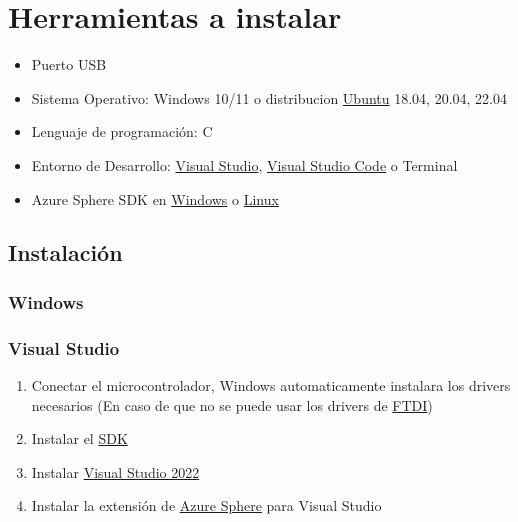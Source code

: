 \section{Herramientas a instalar}

\begin{itemize}
	\item 
	Puerto USB
	\item
	Sistema Operativo: Windows 10/11 o 
	distribucion \href{https://ubuntu.com/}{Ubuntu} 18.04, 20.04, 22.04
	\item 
	Lenguaje de programación: C
	\item 
	Entorno de Desarrollo: \href{https://visualstudio.microsoft.com/es/}{Visual Studio}, 
	\href{https://code.visualstudio.com/}{Visual Studio Code} o Terminal
	\item
	Azure Sphere SDK en \href{https://learn.microsoft.com/en-us/azure-sphere/install/install-sdk}{Windows} o \href{https://learn.microsoft.com/en-us/azure-sphere/install/install-sdk-linux}{Linux}
\end{itemize}

\subsection{Instalación}
\subsubsection{Windows}
\subsubsection*{Visual Studio}
\begin{enumerate}
	\item 
	Conectar el microcontrolador, Windows automaticamente instalara los drivers necesarios (En caso de que no se puede usar los drivers de \href{https://www.ftdichip.com/Drivers/VCP.htm}{FTDI})
	\item 
	Instalar el \href{https://aka.ms/AzureSphereSDKDownload/Windows}{SDK}
	\item 
	Instalar \href{https://visualstudio.microsoft.com/downloads/}{Visual Studio 2022}
	\item 
	Instalar la extensión de \href{https://marketplace.visualstudio.com/items?itemName=AzureSphereTeam.AzureSphereSDKforVisualStudio2022}{Azure Sphere} para Visual Studio
\end{enumerate}
